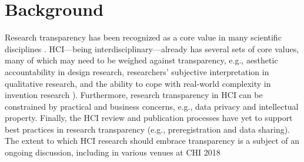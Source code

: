 \documentclass[sigchi-a, authorversion]{acmart}
\begin{document}
%
%
%
%



\section{Background}
Research transparency has been recognized as a core value in many scientific disciplines \cite{Nosek2015}. HCI---being interdisciplinary---already has several sets of core values, many of which may need to be weighed against transparency, e.g., aesthetic accountability in design research, researchers' subjective interpretation in qualitative research, and the ability to cope with real-world complexity in invention research \cite[~ch. 7, 8, and 4, respectively]{Olson2014}). Furthermore, research transparency in HCI can be constrained by practical and business concerns, e.g., data privacy and intellectual property. Finally, the HCI review and publication processes have yet to support best practices in research transparency (e.g., preregistration and data sharing). The extent to which HCI research should embrace transparency is a subject of an ongoing discussion, including in various venues at CHI 2018 \cite{Chuang2018, Cockburn2018, Echtler2018, Wacharamanotham2018}
\end{document}

